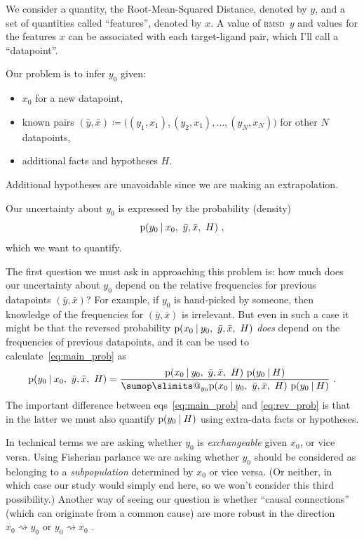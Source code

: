 \documentclass[\ifafour a4paper,12pt,\else a5paper,10pt,\fi%
onecolumn,oneside,article,%
british%
]{memoir}
\makeatletter
\theoremstyle{remark}
\theoremstyle{innote}
\def\sum{\DOTSI\sumop\slimits@}
\newcommand*{\citey}{\parencites*}
\newcommand*{\defd}{\coloneqq}
\newcommand*{\p}{\mathrm{p}}%
\renewcommand*{\|}[1][]{\nonscript\:#1\vert\nonscript\:\mathopen{}}
\renewcommand*{\=}{\TextOrMath\texteq\eq}
\newcommand*{\sects}{\S\S}%
\newcommand*{\eqns}{eqs}%
\newcommand*{\cf}{{cf.}}
\newcommand*{\rmsd}{\textsc{rmsd}}
\newcommand*{\wy}{\bar{y}}
\newcommand*{\wx}{\bar{x}}
\makeatother
\begin{document}
We consider a quantity, the Root-Mean-Squared Distance, denoted by $y$, and
a set of quantities called \enquote{features}, denoted by $x$. A
value of \rmsd\ $y$
and values for the  features $x$ can be associated with each target-ligand
pair, which I'll call a \enquote{datapoint}.

Our problem is to infer $y_{0}$ given:
\begin{itemize}
\item $x_{0}$ for a new datapoint,
\item known pairs
  $(\wy,\wx) \defd \bigl((y_{1}, x_{1}), (y_{2}, x_{1}), \dotsc, (y_{N},
  x_{N})\bigr)$ for other $N$ datapoints,
\item additional facts and hypotheses $H$.
\end{itemize}
Additional hypotheses are unavoidable since we are making an
extrapolation.

Our uncertainty about $y_{0}$ is expressed by the probability (density)
\begin{equation}
  \label{eq:main_prob}
  \p(y_{0} \| x_{0},\ \wy,\wx,\ H) \ ,
\end{equation}
which we want to quantify.

The first question we must ask in approaching this problem is: how much
does our uncertainty about $y_{0}$ depend on the relative frequencies for
previous datapoints $(\wy,\wx)$? For example, if $y_{0}$ is hand-picked by
someone, then knowledge of the frequencies for $(\wy,\wx)$ is irrelevant.
But even in such a case it might be that the reversed probability
$\p(x_{0} \| y_{0},\ \wy,\wx,\ H)$ \emph{does} depend on the frequencies of
previous datapoints, and it can be used to calculate~\eqref{eq:main_prob}
as
\begin{equation}
  \label{eq:rev_prob}
  \p(y_{0} \| x_{0},\ \wy,\wx,\ H) =
  \frac{\p(x_{0} \| y_{0},\ \wy,\wx,\ H)\ \p(y_{0} \| H)}{
    \sum_{y_{0}}\p(x_{0} \| y_{0},\ \wy,\wx,\ H)\ \p(y_{0} \| H)}
\ .
\end{equation}
The important difference between \eqns~\eqref{eq:main_prob} and
\eqref{eq:rev_prob} is that in the latter we must also quantify
$\p(y_{0} \| H)$ using extra-data facts or hypotheses.

In technical terms we are asking whether $y_{0}$ is \emph{exchangeable}
given $x_{0}$, or vice versa. Using Fisherian \citey[\sects~II.4,
IV.1]{fisher1956} parlance we are asking whether $y_{0}$ should be
considered as belonging to a \emph{subpopulation} determined by $x_{0}$ or
vice versa. (Or neither, in which case our study would simply end here, so
we won't consider this third possibility.) Another way of seeing our
question is whether \enquote{causal connections} (which can originate from
a common cause) are more robust in the direction
$x_{0} \rightsquigarrow y_{0}$ or $y_{0} \rightsquigarrow x_{0}$
\parencites[\cf][\sects~2.1.2, 2.2.5]{pearl1988}.
\end{document}
